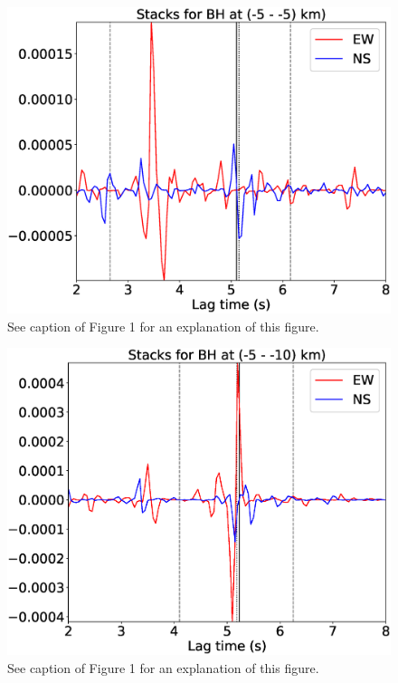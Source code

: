 \documentclass[letterpaper, 12pt]{article}
\begin{document}
\begin{figure}[H]
\includegraphics[width=\linewidth]{figures/intervals/BH_-05_-05_stacks.eps}
\caption{See caption of Figure 1 for an explanation of this figure.}
\end{figure}

\begin{figure}[H]
\includegraphics[width=\linewidth]{figures/intervals/BH_-05_-10_stacks.eps}
\caption{See caption of Figure 1 for an explanation of this figure.}
\end{figure}
\end{document}
